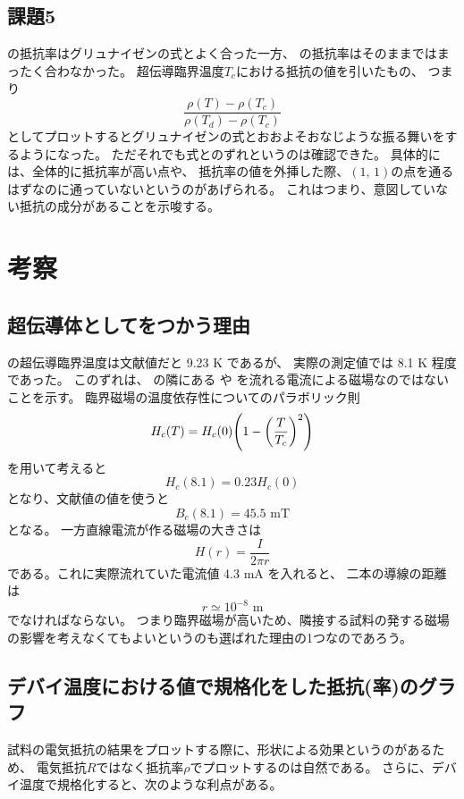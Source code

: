 \documentclass[11pt,dvipdfmx,a4paper]{jsarticle}
\begin{document}
\subsection*{課題5}
 の抵抗率はグリュナイゼンの式とよく合った一方、
 の抵抗率はそのままではまったく合わなかった。
超伝導臨界温度\(T_c\)における抵抗の値を引いたもの、
つまり
\begin{equation}
    \frac{\rho(T)-\rho(T_c)}{\rho(T_d)-\rho(T_c)}
\end{equation}
としてプロットするとグリュナイゼンの式とおおよそおなじような振る舞いをするようになった。
ただそれでも式とのずれというのは確認できた。
具体的には、全体的に抵抗率が高い点や、
抵抗率の値を外挿した際、\((1,\,1)\)の点を通るはずなのに通っていないというのがあげられる。
これはつまり、意図していない抵抗の成分があることを示唆する。

\section{考察}
\subsection{超伝導体としてをつかう理由}
 の超伝導臨界温度は文献値\cite{rikanenpyo}だと 9.23 K であるが、
実際の測定値では 8.1 K 程度であった。
このずれは、 の隣にある  や  を流れる電流による磁場なのではないことを示す。
臨界磁場の温度依存性についてのパラボリック則
\begin{equation}
    H_c(T) = H_c(0)\qty(1-\qty(\frac{T}{T_c})^2)
\end{equation}
を用いて考えると
\begin{equation}
    H_c(8.1) = 0.23 H_c(0)
\end{equation}
となり、文献値\cite{rikanenpyo}の値を使うと
\begin{equation}
    B_c(8.1) = 45.5 \text{ mT}
\end{equation}
となる。
一方直線電流が作る磁場の大きさは
\begin{equation}
    H(r) = \frac{I}{2\pi r}
\end{equation}
である。これに実際流れていた電流値 4.3 mA を入れると、
二本の導線の距離は
\begin{equation}
    r \simeq 10^{-8} \text{ m}
\end{equation}
でなければならない。
つまり臨界磁場が高いため、隣接する試料の発する磁場の影響を考えなくてもよいというのも選ばれた理由の1つなのであろう。

\subsection{デバイ温度における値で規格化をした抵抗(率)のグラフ}
試料の電気抵抗の結果をプロットする際に、形状による効果というのがあるため、
電気抵抗\(R\)ではなく抵抗率\(\rho\)でプロットするのは自然である。
さらに、デバイ温度で規格化すると、次のような利点がある。
\end{document}
